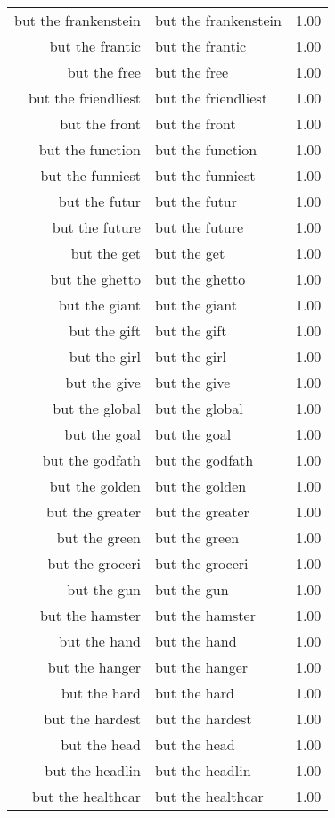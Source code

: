 \begin{table}[ht]
\begin{tabular}{rlr}
  but the frankenstein & but the frankenstein & 1.00 \\ 
  but the frantic & but the frantic & 1.00 \\ 
  but the free & but the free & 1.00 \\ 
  but the friendliest & but the friendliest & 1.00 \\ 
  but the front & but the front & 1.00 \\ 
  but the function & but the function & 1.00 \\ 
  but the funniest & but the funniest & 1.00 \\ 
  but the futur & but the futur & 1.00 \\ 
  but the future & but the future & 1.00 \\ 
  but the get & but the get & 1.00 \\ 
  but the ghetto & but the ghetto & 1.00 \\ 
  but the giant & but the giant & 1.00 \\ 
  but the gift & but the gift & 1.00 \\ 
  but the girl & but the girl & 1.00 \\ 
  but the give & but the give & 1.00 \\ 
  but the global & but the global & 1.00 \\ 
  but the goal & but the goal & 1.00 \\ 
  but the godfath & but the godfath & 1.00 \\ 
  but the golden & but the golden & 1.00 \\ 
  but the greater & but the greater & 1.00 \\ 
  but the green & but the green & 1.00 \\ 
  but the groceri & but the groceri & 1.00 \\ 
  but the gun & but the gun & 1.00 \\ 
  but the hamster & but the hamster & 1.00 \\ 
  but the hand & but the hand & 1.00 \\ 
  but the hanger & but the hanger & 1.00 \\ 
  but the hard & but the hard & 1.00 \\ 
  but the hardest & but the hardest & 1.00 \\ 
  but the head & but the head & 1.00 \\ 
  but the headlin & but the headlin & 1.00 \\ 
  but the healthcar & but the healthcar & 1.00 \\ 

\end{tabular}
\end{table}
